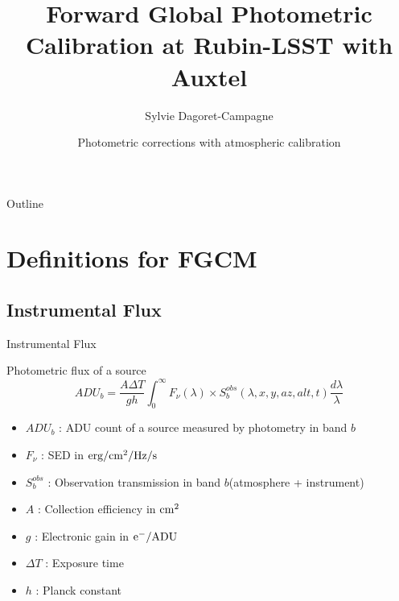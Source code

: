 \documentclass{beamer}
\title[FGCM]{Forward Global Photometric Calibration at Rubin-LSST with Auxtel}
\author[S. Dagoret-Campagne]{
Sylvie Dagoret-Campagne}
\institute[IJCLab]{
  IJCLab,
  CNRS/IN2P3 \& Université Paris-Saclay,
  Orsay, France   }
\date[Orsay, November 2022]{Photometric corrections with atmospheric calibration}
\begin{document}
\begin{frame}
  \titlepage
\end{frame}

\begin{frame}{Outline}
  \tableofcontents
\end{frame}

\section{Definitions for FGCM}
\subsection{Instrumental Flux}

\begin{frame}{Instrumental Flux}
\begin{alertblock}{Photometric flux of a source}
	\begin{equation}
	ADU_b = \frac{A\Delta T}{gh}\int_0^\infty F_\nu(\lambda) \times S_b^{obs}(\lambda,x,y,az,alt,t) \frac{d\lambda}{\lambda}
	\end{equation}
	\begin{itemize}
	\item $ADU_b$ : ADU count of a source measured by photometry in band $b$
	\item $F_\nu$ : SED in ${\rm erg/cm^2/Hz/s}$
	\item $S_b^{obs}$ : Observation transmission in band $b$(atmosphere + instrument)
	\item $A$ : Collection efficiency in ${\rm cm^2}$
	\item $g$ : Electronic gain in ${\rm e^-/ADU}$
	\item $\Delta T$ : Exposure time
	\item $h$ : Planck constant
	\end{itemize}
	\end{alertblock}	
\end{frame}
\end{document}
